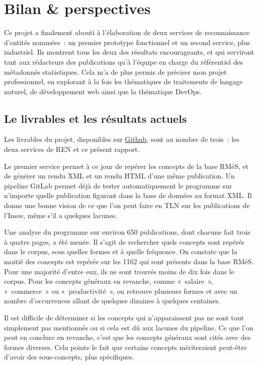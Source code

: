 \section{Bilan \& perspectives}
Ce projet a finalement abouti à l'élaboration de deux services de reconnaissance d'entités nommées~: un premier prototype fonctionnel et un second service, plus industriel. Ils montrent tous les deux des résultats encourageants, et qui serviront tant aux rédacteurs des publications qu'à l'équipe en charge du référentiel des métadonnés statistiques. Cela m'a de plus permis de préciser mon projet professionnel, en explorant à la fois les thématiques de traitements de langage naturel, de développement web ainsi que la thématique DevOps.

\subsection{Le livrables et les résultats actuels}
Les livrables du projet, disponibles sur \href{https://github.com/Mardelor?tab=repositories}{Github}, sont au nombre de trois~: les deux services de REN et ce présent rapport.
\newline

Le premier service permet à ce jour de repérer les concepts de la base RMéS, et de générer un rendu XML et un rendu HTML d'une même publication. Un pipeline GitLab permet déjà de tester automatiquement le programme sur n'importe quelle publication figurant dans la base de données au format XML. Il donne une bonne vision de ce que l'on peut faire en TLN sur les publications de l'Insee, même s'il a quelques lacunes.
\newline

Une analyse du programme sur environ 650 publications, dont chacune fait trois à quatre pages, a été menée. Il s'agit de rechercher quels concepts sont repérés dans le corpus, sous quelles formes et à quelle fréquence. On constate que la moitié des concepts est repérée sur les 1162 qui sont présents dans la base RMéS. Pour une majorité d'entre eux, ils ne sont trouvés moins de dix fois dans le corpus. Pour les concepts généraux en revanche, comme «~salaire~», «~commerce~» ou «~productivité~», on retrouve plusieurs formes et avec un nombre d'occurrences allant de quelques dizaines à quelques centaines.

Il est difficile de déterminer si les concepts qui n'apparaissent pas ne sont tout simplement pas mentionnés ou si cela est dû aux lacunes du pipeline. Ce que l'on peut en conclure en revanche, c'est que les concepts généraux sont cités avec des formes diverses. Cela pointe le fait que certains concepts mériteraient peut-être d'avoir des sous-concepts, plus spécifiques.
\newline

